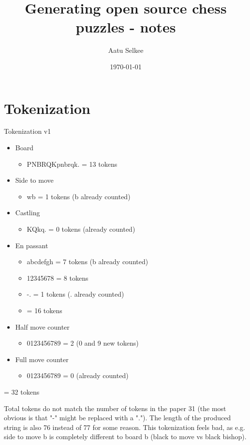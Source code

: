 \documentclass[a4paper, 12pt]{article}
\title{Generating open source chess puzzles - notes}
\author{Aatu Selkee}
\date{\today}
\begin{document}
\maketitle

\tableofcontents
\newpage

\section{Tokenization}

Tokenization v1

\begin{itemize}
    \item Board\begin{itemize}
        \item PNBRQKpnbrqk. = 13 tokens
    \end{itemize}
    \item Side to move\begin{itemize}
        \item wb = 1 tokens (b already counted)
    \end{itemize}
    \item Castling\begin{itemize}
        \item KQkq. = 0 tokens (already counted)
    \end{itemize}
    \item En passant\begin{itemize}
        \item abcdefgh = 7 tokens (b already counted)
        \item 12345678 = 8 tokens
        \item -. = 1 tokens (. already counted)
        \item = 16 tokens
    \end{itemize}
    \item Half move counter\begin{itemize}
        \item 0123456789 = 2 (0 and 9 new tokens)
    \end{itemize}
    \item Full move counter\begin{itemize}
        \item 0123456789 = 0 (already counted)
    \end{itemize}
\end{itemize}

= 32 tokens

Total tokens do not match the number of tokens in the paper 31 (the most obvious is that "-" might be replaced with a "."). The length of the produced string is also 76 instead of 77 for some reason. This tokenization feels bad, as e.g. side to move b is completely different to board b (black to move vs black bishop).
\end{document}
